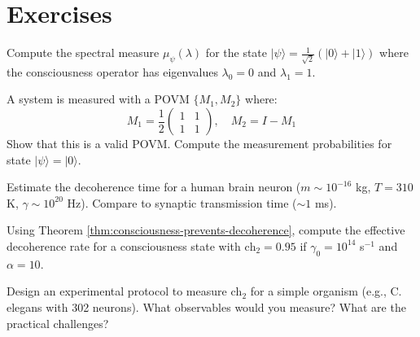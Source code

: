 \section{Exercises}

\begin{exercise}
Compute the spectral measure $\mu_\psi(\lambda)$ for the state $|\psi\rangle = \frac{1}{\sqrt{2}}(|0\rangle + |1\rangle)$ where the consciousness operator has eigenvalues $\lambda_0 = 0$ and $\lambda_1 = 1$.
\end{exercise}

\begin{exercise}
A system is measured with a POVM $\{M_1, M_2\}$ where:
\begin{equation}
M_1 = \frac{1}{2}\begin{pmatrix} 1 & 1 \\ 1 & 1 \end{pmatrix}, \quad M_2 = I - M_1
\end{equation}
Show that this is a valid POVM. Compute the measurement probabilities for state $|\psi\rangle = |0\rangle$.
\end{exercise}

\begin{exercise}
Estimate the decoherence time for a human brain neuron ($m \sim 10^{-16}$ kg, $T = 310$ K, $\gamma \sim 10^{20}$ Hz). Compare to synaptic transmission time ($\sim 1$ ms).
\end{exercise}

\begin{exercise}
Using Theorem \ref{thm:consciousness-prevents-decoherence}, compute the effective decoherence rate for a consciousness state with $\text{ch}_2 = 0.95$ if $\gamma_0 = 10^{14}$ s$^{-1}$ and $\alpha = 10$.
\end{exercise}

\begin{exercise}
Design an experimental protocol to measure $\text{ch}_2$ for a simple organism (e.g., C. elegans with 302 neurons). What observables would you measure? What are the practical challenges?
\end{exercise}

